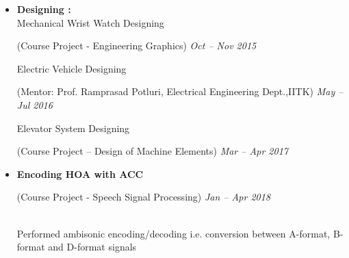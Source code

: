 \documentclass[11pt,a4paper,roman]{moderncv}        %
\begin{document}
{{{{{{{{\begin{minipage}{1.16\maincolumnwidth}
{\begin{itemize}
          \textbullet{}Vulcan Gun Model Prototype \begin{footnotesize}{(Course Project – Manufacturing Processes II)}\hspace{3.5cm}  \textit{{Feb – Apr 2016}}\end{footnotesize}
          
          \textbullet{}Portable Cloth Dryer \begin{footnotesize}{(Course Project – New Product Design and Prototyping)} \hspace{3.4cm}  \textit{\footnotesize{Jan – Apr 2017}}\end{footnotesize}
          
          \textbullet{}The Elbow Engine \begin{footnotesize}{( B.Tech Undergraduate Project)}\hspace{6.2cm} \textit{\footnotesize{Aug 2017 – May 2018}}\end{footnotesize}
    
          \item \textbf{Designing :}\\
          \textbullet{}Mechanical Wrist Watch Designing \begin{footnotesize}(Course Project - Engineering Graphics) 
           \hspace{3.4cm} \textit{{Oct – Nov 2015}}\end{footnotesize}
          
          \textbullet{}Electric Vehicle Designing\begin{footnotesize} (Mentor: Prof. Ramprasad Potluri, Electrical Engineering Dept.,IITK)\hspace{0.6cm} \textit{\footnotesize{May – Jul 2016}}\end{footnotesize} 
          
          \textbullet{}Elevator System Designing \begin{footnotesize}(Course Project – Design of Machine Elements)\hspace{3.9cm} \textit{\footnotesize{Mar – Apr 2017}}\end{footnotesize}
          
           
           
           
           \item \textbf{Encoding HOA with ACC} \begin{footnotesize}(Course Project - Speech Signal Processing)\hspace{4.2cm} \textit{Jan – Apr 2018}\end{footnotesize}\\
           \textbullet Performed ambisonic encoding/decoding i.e. conversion between A-format, B-format and D-format signals
		\end{itemize}}%
\end{minipage}%


}}}}}}}}
\end{document}
